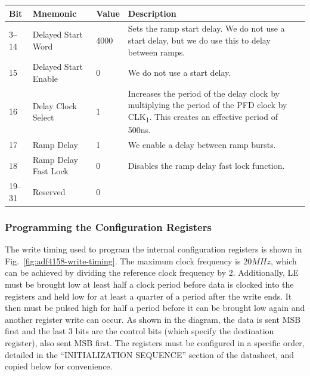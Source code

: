 \label{tab:adf4158-reg-map-7}
\begin{tabularx}{\textwidth}{l l l X}
        \caption{DELAY REGISTER (R7) MAP} \\
        \toprule
        Bit & Mnemonic & Value & Description \\
        \midrule

        3--14 & Delayed Start Word & 4000 & Sets the ramp start delay. We do not use a start delay, but we
        do use this to delay between ramps. \\
        15 & Delayed Start Enable & 0 & We do not use a start delay. \\
        16 & Delay Clock Select & 1 & Increases the period of the delay clock by multiplying the period of
        the PFD clock by CLK\textsubscript{1}. This creates an effective
        period of 500ns. \\
        17 & Ramp Delay & 1 & We enable a delay between ramp bursts. \\
        18 & Ramp Delay Fast Lock & 0 & Disables the ramp delay fast lock function. \\
        19--31 & Reserved & 0 & \\

        \bottomrule
\end{tabularx}

\subsubsection{Programming the Configuration Registers}
\label{sec:adf4158-program}

The write timing used to program the internal configuration registers is shown in
Fig.~\ref{fig:adf4158-write-timing}. The maximum clock frequency is $20 \si{MHz}$, which can be
achieved by dividing the reference clock frequency by 2. Additionally, LE must be brought low at
least half a clock period before data is clocked into the registers and held low for at least a
quarter of a period after the write ends. It then must be pulsed high for half a period before it
can be brought low again and another register write can occur. As shown in the diagram, the data is
sent MSB first and the last 3 bits are the control bits (which specify the destination register),
also sent MSB first. The registers must be configured in a specific order, detailed in the
``INITIALIZATION SEQUENCE'' section of the datasheet, and copied below for convenience.

